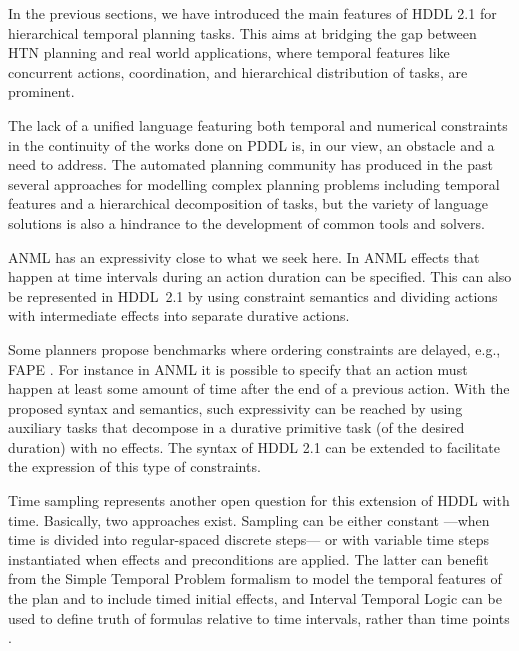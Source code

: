 \documentclass[letterpaper]{article} %
\begin{document}
In the previous sections, we have introduced the main features of HDDL 2.1 for hierarchical temporal planning tasks.
This aims at bridging the gap between HTN planning and real world applications, where temporal features like concurrent actions, coordination, and hierarchical distribution of tasks, are prominent.

The lack of a unified language featuring both temporal and numerical constraints in the continuity of the works done on PDDL is, in our view, an obstacle and a need to address. The automated planning community has produced in the past several approaches for modelling complex planning problems including temporal features and a hierarchical decomposition of tasks, but the variety of language solutions is also a hindrance to the development of common tools and solvers.

ANML  \citep{smith08} has an expressivity close to what we seek here.
In ANML effects that happen at time intervals during an action duration can be specified. This  can also be represented in HDDL~2.1 by using constraint semantics and dividing actions with intermediate effects into separate durative actions.

Some planners propose benchmarks where ordering constraints are delayed, e.g., FAPE \cite{dvorak2014}.%
For instance in ANML it is possible to specify that an action must happen at least some amount of time after the end of a previous action. With the proposed syntax and semantics, such expressivity can be reached by using auxiliary tasks that decompose in a durative primitive task (of the desired duration) with no effects. The syntax of HDDL 2.1 can be extended to facilitate the expression of this type of constraints.

Time sampling represents another open question for this extension of HDDL with time.
Basically, two approaches exist. Sampling can be either constant ---when time is divided into regular-spaced discrete steps--- or with variable time steps instantiated when effects and preconditions are applied. The latter can benefit from the Simple Temporal Problem formalism to model the temporal features of the plan and to include timed initial effects, and Interval Temporal Logic can be used to define truth of formulas relative to time intervals, rather than time points \citep{BRESOLIN2014269}.

\end{document}
